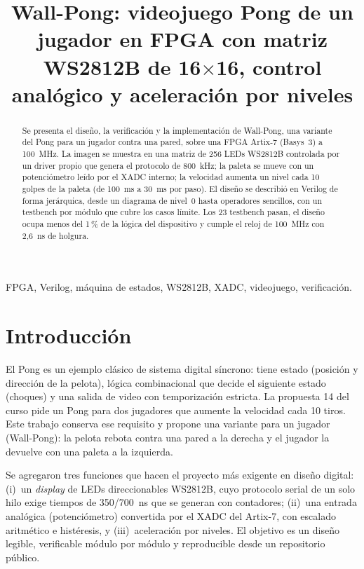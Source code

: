 \documentclass[conference]{IEEEtran}
\begin{document}
\title{Wall-Pong: videojuego Pong de un jugador en FPGA con matriz WS2812B de 16$\times$16, control analógico y aceleración por niveles}

\author{
}

\maketitle

\begin{abstract}
Se presenta el diseño, la verificación y la implementación de Wall-Pong, una variante del Pong para un
jugador contra una pared, sobre una FPGA Artix-7 (Basys~3) a 100~MHz. La imagen se muestra en una
matriz de 256 LEDs WS2812B controlada por un driver propio que genera el protocolo de 800~kHz; la paleta
se mueve con un potenciómetro leído por el XADC interno; la velocidad
aumenta un nivel cada 10 golpes de la paleta (de 100~ms a 30~ms por paso). El diseño se describió en
Verilog de forma jerárquica, desde un diagrama de nivel~0 hasta operadores sencillos, con un testbench
por módulo que cubre los casos límite. Los 23 testbench pasan, el diseño ocupa menos del 1\,\% de la
lógica del dispositivo y cumple el reloj de 100~MHz con 2{,}6~ns de holgura.
\end{abstract}

\begin{IEEEkeywords}
FPGA, Verilog, máquina de estados, WS2812B, XADC, videojuego, verificación.
\end{IEEEkeywords}

\section{Introducción}
El Pong es un ejemplo clásico de sistema digital síncrono: tiene estado (posición y dirección de la
pelota), lógica combinacional que decide el siguiente estado (choques) y una salida de video con
temporización estricta. La propuesta 14 del curso pide un Pong para dos jugadores que aumente la
velocidad cada 10 tiros. Este trabajo conserva ese requisito y propone una variante para un jugador
(Wall-Pong): la pelota rebota contra una pared a la derecha y el jugador la devuelve con una paleta a la
izquierda.

Se agregaron tres funciones que hacen el proyecto más exigente en diseño digital: (i)~un
\emph{display} de LEDs direccionables WS2812B, cuyo protocolo serial de un solo hilo exige tiempos de
350/700~ns que se generan con contadores; (ii)~una entrada analógica (potenciómetro) convertida por el
XADC del Artix-7, con escalado aritmético e histéresis, y (iii)~aceleración por niveles. El objetivo es un diseño legible, verificable módulo por módulo y
reproducible desde un repositorio público.
\end{document}
